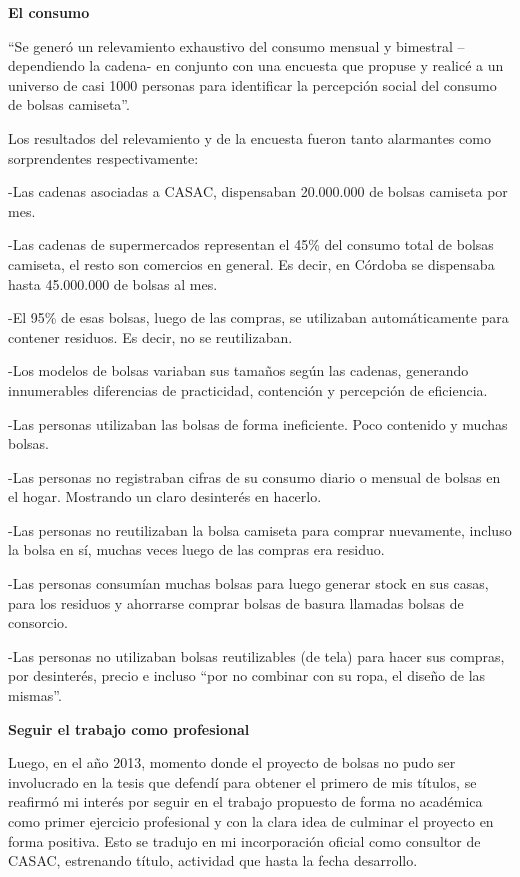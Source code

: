 \begin{fullwidth}
\textbf{El consumo}

``Se generó un relevamiento exhaustivo del consumo mensual y bimestral
--dependiendo la cadena- en conjunto con una encuesta que propuse y
realicé a un universo de casi 1000 personas para identificar la
percepción social del consumo de bolsas camiseta''.

Los resultados del relevamiento y de la encuesta fueron tanto alarmantes
como sorprendentes respectivamente:

-Las cadenas asociadas a CASAC, dispensaban 20.000.000 de bolsas
camiseta por mes.

-Las cadenas de supermercados representan el 45\% del consumo total de
bolsas camiseta, el resto son comercios en general. Es decir, en Córdoba
se dispensaba hasta 45.000.000 de bolsas al mes.

-El 95\% de esas bolsas, luego de las compras, se utilizaban
automáticamente para contener residuos. Es decir, no se reutilizaban.

-Los modelos de bolsas variaban sus tamaños según las cadenas, generando
innumerables diferencias de practicidad, contención y percepción de
eficiencia.

-Las personas utilizaban las bolsas de forma ineficiente. Poco contenido
y muchas bolsas.

-Las personas no registraban cifras de su consumo diario o mensual de
bolsas en el hogar. Mostrando un claro desinterés en hacerlo.

-Las personas no reutilizaban la bolsa camiseta para comprar nuevamente,
incluso la bolsa en sí, muchas veces luego de las compras era residuo.

-Las personas consumían muchas bolsas para luego generar stock en sus
casas, para los residuos y ahorrarse comprar bolsas de basura llamadas
bolsas de consorcio.

-Las personas no utilizaban bolsas reutilizables (de tela) para hacer
sus compras, por desinterés, precio e incluso ``por no combinar con su
ropa, el diseño de las mismas''.

\textbf{Seguir el trabajo como profesional}

Luego, en el año 2013, momento donde el proyecto de bolsas no pudo ser
involucrado en la tesis que defendí para obtener el primero de mis
títulos, se reafirmó mi interés por seguir en el trabajo propuesto de
forma no académica como primer ejercicio profesional y con la clara idea
de culminar el proyecto en forma positiva. Esto se tradujo en mi
incorporación oficial como consultor de CASAC, estrenando título,
actividad que hasta la fecha desarrollo.


\end{fullwidth}
